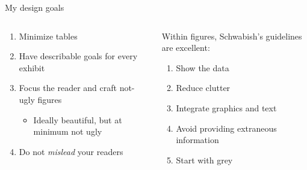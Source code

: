 \documentclass[notes,11pt, aspectratio=169]{beamer}
\begin{document}
\begin{frame}{My design goals}
  \begin{columns}[T] %
    \begin{column}{.6\textwidth}
      \begin{enumerate}
      \item Minimize tables 
      \item Have describable goals for every exhibit
      \item Focus the reader and craft not-ugly figures
        \begin{itemize}
        \item Ideally beautiful, but at minimum not ugly
        \end{itemize}
      \item Do not \emph{mislead} your readers
      \end{enumerate}
      \pause
  \end{column}%
  \hfill%
  \begin{column}{.4\textwidth}
    Within figures, Schwabish's guidelines are excellent:
    \begin{enumerate}
    \item Show the data
    \item Reduce clutter
    \item Integrate graphics and text
    \item Avoid providing extraneous information
    \item Start with grey
    \end{enumerate}
  \end{column}
\end{columns}
\end{frame}
\end{document}
